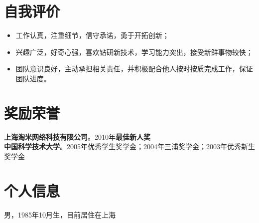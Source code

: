 \documentclass[margin]{res}
\newcommand{\ustc}{中国科学技术大学}
\newcommand{\taomee}{上海淘米网络科技有限公司}
\begin{document}
\section{\Large 自我评价}
\begin{itemize}
    \item 工作认真，注重细节，信守承诺，勇于开拓创新；
    \item 兴趣广泛，好奇心强，喜欢钻研新技术，学习能力突出，接受新鲜事物较快；
    \item 团队意识良好，主动承担相关责任，并积极配合他人按时按质完成工作，保证团队进度。 
\end{itemize}


\section{\Large 奖励荣誉} 
{\bf \taomee}。2010年{\bf 最佳新人奖}\\
{\bf \ustc}。2005年优秀学生奖学金；2004年三浦奖学金；2003年优秀新生奖学金

\section{\Large 个人信息}
    男，1985年10月生，目前居住在上海
\end{document}

